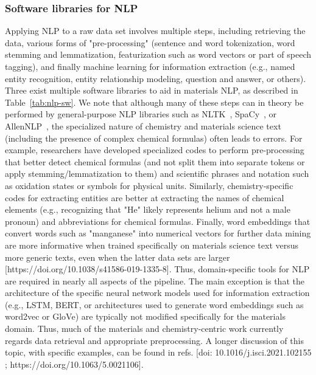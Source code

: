 \documentclass[pdflatex,sn-mathphys]{sn-jnl}%
\theoremstyle{thmstyleone}%
\theoremstyle{thmstyletwo}%
\theoremstyle{thmstylethree}%
\begin{document}
\subsubsection{Software libraries for NLP}

Applying NLP to a raw data set involves multiple steps, including retrieving the data, various forms of "pre-processing" (sentence and word tokenization, word stemming and lemmatization, featurization such as word vectors or part of speech tagging), and finally machine learning for information extraction (e.g., named entity recognition, entity relationship modeling, question and answer, or others). Three exist multiple software libraries to aid in materials NLP, as described in Table~\ref{tab:nlp-sw}.
We note that although many of these steps can in theory be performed by general-purpose NLP libraries such as NLTK~\cite{nltk}, SpaCy~\cite{spacy}, or AllenNLP~\cite{allenNLP}, the specialized nature of chemistry and materials science text (including the presence of complex chemical formulas) often leads to errors. For example, researchers have developed specialized codes to perform pre-processing that better detect chemical formulas (and not split them into separate tokens or apply stemming/lemmatization to them) and scientific phrases and notation such as oxidation states or symbols for physical units. Similarly, chemistry-specific codes for extracting entities are better at extracting the names of chemical elements (e.g., recognizing that "He" likely represents helium and not a male pronoun) and abbreviations for chemical formulas. Finally, word embeddings that convert words such as "manganese" into numerical vectors for further data mining are more informative when trained specifically on materials science text versus more generic texts, even when the latter data sets are larger [https://doi.org/10.1038/s41586-019-1335-8]. Thus, domain-specific tools for NLP are required in nearly all aspects of the pipeline. The main exception is that the architecture of the specific neural network models used for information extraction (e.g., LSTM, BERT, or architectures used to generate word embeddings such as word2vec or GloVe) are typically not modified specifically for the materials domain. Thus, much of the materials and chemistry-centric work currently regards data retrieval and appropriate preprocessing. A longer discussion of this topic, with specific examples, can be found in refs. [doi: 10.1016/j.isci.2021.102155 ; https://doi.org/10.1063/5.0021106].
\end{document}
